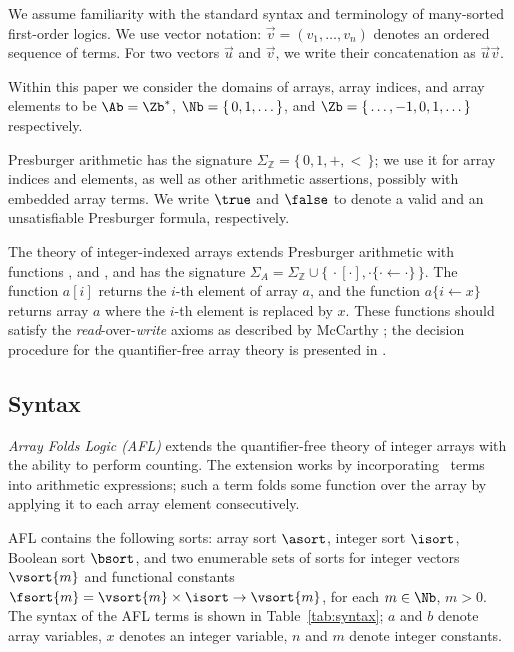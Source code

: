 We assume familiarity with the standard syntax and terminology of many-sorted first-order logics. We use vector notation: $\vec{v} = (v_1,\ldots,v_n)$ denotes an ordered sequence of terms. For two vectors $\vec{u}$ and $\vec{v}$, we write their concatenation as $\vec{u}\vec{v}$.







Within this paper we consider the domains of arrays, array
indices, and array elements to be $\Ab = \Zb^*$,
$\Nb = \{\,0,1,\ldots \,\}$, and $\Zb = \{\,\ldots,-1,0,1,\ldots \,\}$
respectively.

Presburger arithmetic has the signature
$\Sigma_{\mathbb{Z}} = \{\,0,1,+,<\,\}$; we use it for array indices
and elements, as well as other arithmetic assertions, possibly with
embedded array terms.
We write $\true$ and $\false$ to denote a valid and an unsatisfiable Presburger formula, respectively.

The theory of integer-indexed arrays extends Presburger arithmetic
with functions , and , and has the signature
$\Sigma_{A} = \Sigma_{\mathbb{Z}} \cup \{\,\cdot[\cdot],\cdot\{\cdot
\leftarrow \cdot\}\, \}$.
The  function $a[i]$ returns the $i$-th element of array
$a$, and the  function $a\{i \leftarrow x\}$ returns array $a$ where the $i$-th element is replaced by $x$. These functions should satisfy the \emph{read}-over-\emph{write} axioms as described by McCarthy \cite{McCarthy62}; the decision procedure for the quantifier-free array theory is presented in \cite{QuantifierFreeArrays}.


\subsection{Syntax}
\label{afl-syntax}

\emph{Array Folds Logic (AFL)} extends the quantifier-free theory of integer arrays with the ability to perform counting. The extension works by incorporating \Fold\ terms into arithmetic expressions; such a term folds some function over the array by applying it to each array element consecutively.

AFL contains the following sorts: array sort $\asort$, integer sort $\isort$, Boolean sort $\bsort$, and two enumerable sets of sorts for integer vectors $\vsort{m}$ and functional constants $\fsort{m} = \vsort{m} \times \isort \rightarrow \vsort{m}$, for each $m \in \Nb$, $m>0$. The syntax of the AFL terms is shown in Table~\ref{tab:syntax}; $a$ and $b$ denote array variables, $x$ denotes an integer variable, $n$ and $m$ denote integer constants.

